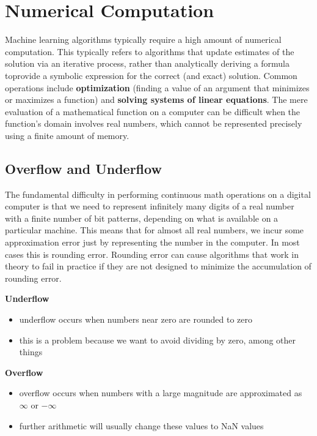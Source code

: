 \documentclass[11pt, twocolumn]{report}
\begin{document}
\setcounter{chapter}{3}

\chapter{Numerical Computation}
Machine learning algorithms typically require a high amount of numerical
computation. This typically refers to algorithms that update estimates of the
solution via an iterative process, rather than analytically deriving a formula
toprovide a symbolic expression for the correct (and exact) solution. Common
operations include \textbf{optimization} (finding a value of an argument that
minimizes or maximizes a function) and \textbf{solving systems of linear
  equations}. The mere evaluation of a mathematical function on a computer can
be difficult when the function's domain involves real numbers, which cannot be
represented precisely using a finite amount of memory.

\section{Overflow and Underflow}
The fundamental difficulty in performing continuous math operations on a
digital computer is that we need to represent infinitely many digits of a real
number with a finite number of bit patterns, depending on what is available on
a particular machine. This means that for almost all real numbers, we incur
some approximation error just by representing the number in the computer. In
most cases this is rounding error.  Rounding error can cause algorithms that
work in theory to fail in practice if they are not designed to minimize the
accumulation of rounding error.

\textbf{Underflow}
\begin{itemize}
  \item underflow occurs when numbers near zero are rounded to zero
  \item this is a problem because we want to avoid dividing by zero, among
    other things
\end{itemize}

\textbf{Overflow}
\begin{itemize}
  \item overflow occurs when numbers with a large magnitude are approximated as
    $\infty$ or $-\infty$
  \item further arithmetic will usually change these values to NaN values
\end{itemize}
\end{document}

